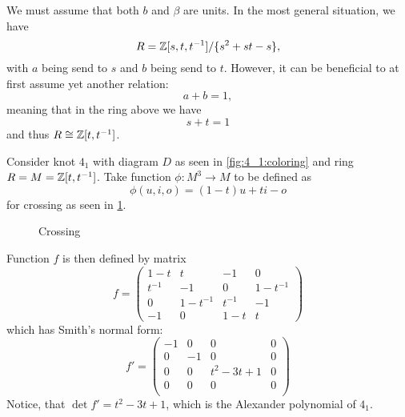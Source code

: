 We must assume that both $b$ and $\beta$ are units. In the most general situation, we have 
$$R=\operatorname{\mathbb{Z}}[s, t, t^{-1}]/\{s^2+st-s\},$$
with $a$ being send to $s$ and $b$ being send to $t$. However, it can be beneficial to at first assume yet another relation: 
$$a+b=1,$$
meaning that in the ring above we have
$$s+t=1$$
and thus $R\cong \operatorname{\mathbb{Z}}[t, t^{-1}]$.






















\begin{example}
  Consider knot $4_1$ with diagram $D$ as seen in \cref{fig:4_1:coloring} and ring $R=M=\operatorname{\mathbb{Z}}[t, t^{-1}]$. Take function $\phi:M^3\to M$ to be defined as
  $$\phi(u, i, o)=(1-t)u+ti-o$$
  for crossing as seen in \cref{fig:crossing:4_1:example}.

  \begin{figure}[h]\centering
    \caption{\label{fig:crossing:4_1:example} Crossing}
  \end{figure}

  Function $f$ is then defined by matrix
  $$
  f=\begin{pmatrix}
    1-t & t & -1 & 0 \\
    t^{-1} & -1 & 0 & 1-t^{-1}\\
    0 & 1-t^{-1} & t^{-1} & -1\\
    -1 & 0 & 1-t & t
  \end{pmatrix}
  $$
  which has Smith's normal form:
  $$
  f'=\begin{pmatrix}
    -1 & 0 & 0 & 0 \\
    0 & -1 & 0 & 0\\
    0 & 0 & t^2-3t+1 & 0\\
    0 & 0 & 0 & 0\\
  \end{pmatrix}
  $$
  Notice, that $\det f'=t^2-3t+1$, which is the Alexander polynomial of $4_1$.


\end{example}
